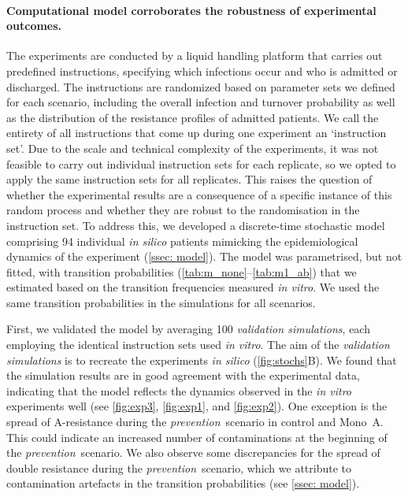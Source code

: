 \paragraph{Computational model corroborates the robustness of experimental outcomes.}
The experiments are conducted by a liquid handling platform that carries out predefined instructions, specifying which infections occur and who is admitted or discharged.
The instructions are randomized based on parameter sets we defined for each scenario, including the overall infection and turnover probability as well as the distribution of the resistance profiles of admitted patients.
We call the entirety of all instructions that come up during one experiment an `instruction set'.
Due to the scale and technical complexity of the experiments, it was not feasible to carry out individual instruction sets for each replicate, so we opted to apply the same instruction sets for all replicates.
This raises the question of whether the experimental results are a consequence of a specific instance of this random process and whether they are robust to the randomisation in the instruction set.
To address this, we developed a discrete-time stochastic model comprising 94 individual \textit{in silico} patients mimicking the epidemiological dynamics of the experiment (\autoref{ssec: model}).
The model was parametrised, but not fitted, with transition probabilities (\autoref{tab:m_none}--\autoref{tab:m1_ab}) that we estimated based on the transition frequencies measured \textit{in vitro}.
We used the same transition probabilities in the simulations for all scenarios.

First, we validated the model by averaging 100 \textit{validation simulations}, each employing the identical instruction sets used \textit{in vitro}.
The aim of the \textit{validation simulations} is to recreate the experiments \textit{in silico} (\autoref{fig:stochs}B).
We found that the simulation results are in good agreement with the experimental data, indicating that the model reflects the dynamics observed in the \textit{in vitro} experiments well (see \autoref{fig:exp3}, \autoref{fig:exp1}, and \autoref{fig:exp2}).
One exception is the spread of A-resistance during the \textit{prevention}~scenario in control and Mono~A.
This could indicate an increased number of contaminations at the beginning of the \textit{prevention}~scenario.
We also observe some discrepancies for the spread of double resistance during the \textit{prevention}~scenario, which we attribute to contamination artefacts in the transition probabilities (see \autoref{ssec: model}).


